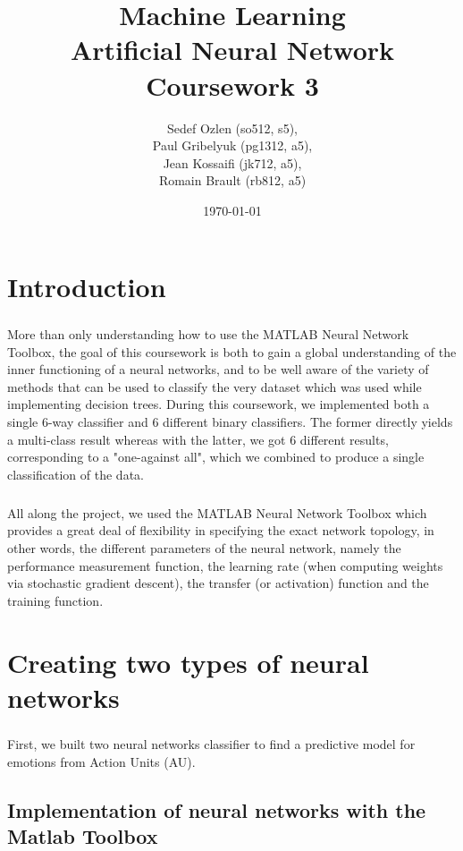 \documentclass[a4paper,12pt,oneside,final]{report}
\author{
    Sedef Ozlen (so512, s5), \\ 
    Paul Gribelyuk (pg1312, a5), \\
    Jean Kossaifi (jk712, a5), \\ 
    Romain Brault (rb812, a5)
}
\title{\Huge Machine Learning \\ Artificial Neural Network \\ Coursework 3}
\date{\today}
\begin{document}
\maketitle
\tableofcontents
\listoffigures

\chapter{Introduction}
\paragraph{}
More than only understanding how to use the MATLAB Neural Network Toolbox, the goal of this coursework is both to gain a global understanding of the inner functioning of a neural networks, and to be well aware of the variety of methods that can be used to classify the very dataset which was used while implementing decision trees.
During this coursework, we implemented both a single 6-way classifier and 6 different binary classifiers. The former directly yields a multi-class result whereas with the latter, we got 6 different results, corresponding to a "one-against all", which we combined to produce a single classification of the data.
\paragraph{}
All along the project, we used the MATLAB Neural Network Toolbox which provides a great deal of flexibility in specifying the exact network topology, in other words, the different parameters of the neural network, namely the performance measurement function, the learning rate (when computing weights via stochastic gradient descent), the transfer (or activation) function and the training function.

\chapter{Creating two types of neural networks}
\paragraph{}
First, we built two neural networks classifier to find a predictive model for emotions from Action Units (AU).
\section{Implementation of neural networks with the Matlab Toolbox}
\end{document}
